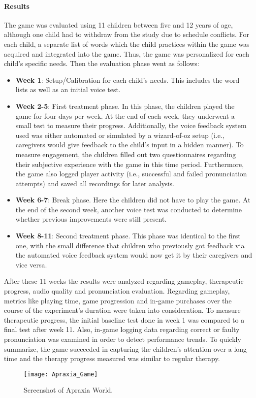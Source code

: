 \documentclass[draft,final]{vutinfth} %
\begin{document}
\paragraph{Results} 
The game was evaluated using 11 children between five and 12 years of age, although one child had to withdraw from the study due to schedule conflicts. For each child, a separate list of words which the child practices within the game was acquired and integrated into the game. Thus, the game was personalized for each child's specific needs. Then the evaluation phase went as follows: 
\begin{itemize}
\item \textbf{Week 1}: Setup/Calibration for each child's needs. This includes the word lists as well as an initial voice test.
\item \textbf{Week 2-5}: First treatment phase. In this phase, the children played the game for four days per week. At the end of each week, they underwent a small test to measure their progress. Additionally, the voice feedback system used was either automated or simulated by a wizard-of-oz setup (i.e., caregivers would give feedback to the child's input in a hidden manner). To measure engagement, the children filled out two questionnaires regarding their subjective experience with the game in this time period. Furthermore, the game also logged player activity (i.e., successful and failed pronunciation attempts) and saved all recordings for later analysis.
\item \textbf{Week 6-7}: Break phase. Here the children did not have to play the game. At the end of the second week, another voice test was conducted to determine whether previous improvements were still present.
\item \textbf{Week 8-11}: Second treatment phase. This phase was identical to the first one, with the small difference that children who previously got feedback via the automated voice feedback system would now get it by their caregivers and vice versa.

 
\end{itemize} 
After these 11 weeks the results were analyzed regarding gameplay, therapeutic progress, audio quality and pronunciation evaluation. Regarding gameplay, metrics like playing time, game progression and in-game purchases over the course of the experiment's duration were taken into consideration. To measure therapeutic progress, the initial baseline test done in week 1 was compared to a final test after week 11. Also, in-game logging data regarding correct or faulty pronunciation was examined in order to detect performance trends.
To quickly summarize, the game succeeded in capturing the children's attention over a long time and the therapy progress measured was similar to regular therapy.
\begin{figure}
\begin{center}
\texttt{[image: Apraxia\_Game]}
\end{center}
\caption{Screenshot of Apraxia World\cite{hair2021longitudinal}.}
\end{figure}
\end{document}
